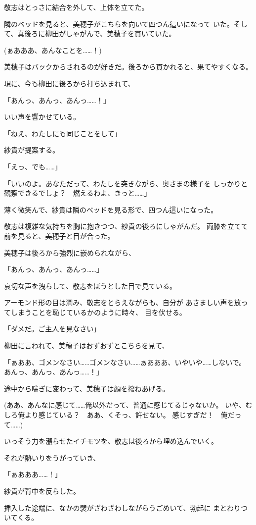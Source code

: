 ﻿\documentclass[
    book,tate,
    line_length=30zw,
    jafontsize=12pt,
    paper=b5j,
    landscape,
    ]{jlreq}
\begin{document}
敬志はとっさに結合を外して、上体を立てた。

隣のベッドを見ると、美穂子がこちらを向いて四つん這いになって
いた。そして、真後ろに柳田がしゃがんで、美穂子を貫いていた。

(ぁあああ、あんなことを……！)

美穂子はバックからされるのが好きだ。後ろから貫かれると、果てやすくなる。

現に、今も柳田に後ろから打ち込まれて、

「あんっ、あんっ、あんっ……！」

いい声を響かせている。

「ねえ、わたしにも同じことをして」

紗貴が提案する。

「えっ、でも……」

「いいのよ。あなただって、わたしを突きながら、奥さまの様子を
しっかりと観察できるでしょ？　燃えるわよ、きっと……」

薄く微笑んで、紗貴は隣のベッドを見る形で、四つん這いになった。

敬志は複雑な気持ちを胸に抱きつつ、紗貴の後ろにしゃがんだ。
両膝を立てて前を見ると、美穂子と目が合った。

美穂子は後ろから強烈に嵌められながら、

「あんっ、あんっ、あんっ……」

哀切な声を洩らして、敬志をぼうとした目で見ている。

アーモンド形の目は潤み、敬志をとらえながらも、自分が
あさましい声を放ってしまうことを恥じているかのように時々、
目を伏せる。

「ダメだ。ご主人を見なさい」

柳田に言われて、美穂子はおずおずとこちらを見て、

「ぁああ、ゴメンなさい……ゴメンなさい……ぁあああ、いやいや……しないで。
あんっ、あんっ、あんっ……！」

途中から喘ぎに変わって、美穂子は顔を撥ねあげる。

(ああ、あんなに感じて……俺以外だって、普通に感じてるじゃないか。
いや、むしろ俺より感じている？　ああ、くそっ、許せない。
感じすぎだ！　俺だって……)

いっそう力を漲らせたイチモツを、敬志は後ろから埋め込んでいく。

それが熱いりをうがっていき、

「ぁあああ……！」

紗貴が背中を反らした。

挿入した途端に、なかの襞がざわざわしながらうごめいて、勃起に
まとわりついてくる。
\end{document}
